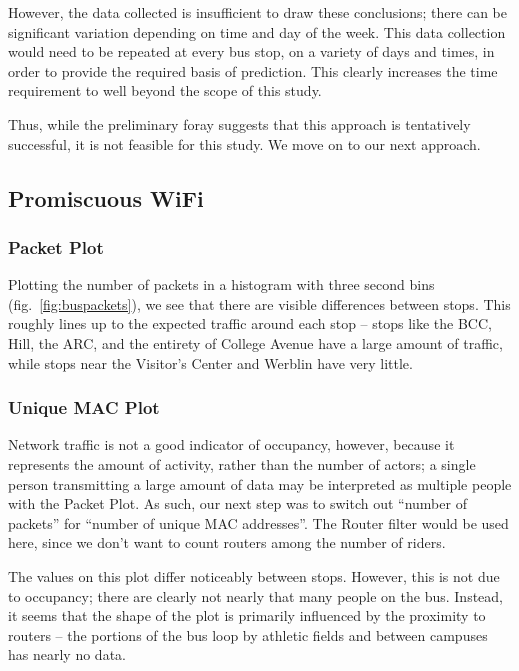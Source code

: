However, the data collected is insufficient to draw these conclusions; there can be significant variation depending on time and day of the week.
This data collection would need to be repeated at every bus stop, on a variety of days and times, in order to provide the required basis of prediction.
This clearly increases the time requirement to well beyond the scope of this study.
	
Thus, while the preliminary foray suggests that this approach is tentatively successful, it is not feasible for this study.
We move on to our next approach.

\subsection*{Promiscuous WiFi}
    
\subsubsection*{Packet Plot}

Plotting the number of packets in a histogram with three second bins (fig.~\ref{fig:buspackets}), we see that there are visible differences between stops.
This roughly lines up to the expected traffic around each stop -- stops like the BCC, Hill, the ARC, and the entirety of College Avenue have a large amount of traffic, while stops near the Visitor's Center and Werblin have very little.

\subsubsection*{Unique MAC Plot}

Network traffic is not a good indicator of occupancy, however, because it represents the amount of activity, rather than the number of actors; a single person transmitting a large amount of data may be interpreted as multiple people with the Packet Plot.
As such, our next step was to switch out ``number of packets'' for ``number of unique MAC addresses''.
The Router filter would be used here, since we don't want to count routers among the number of riders.


The values on this plot differ noticeably between stops.
However, this is not due to occupancy; there are clearly not nearly that many people on the bus.
Instead, it seems that the shape of the plot is primarily influenced by the proximity to routers -- the portions of the bus loop by athletic fields and between campuses has nearly no data.

